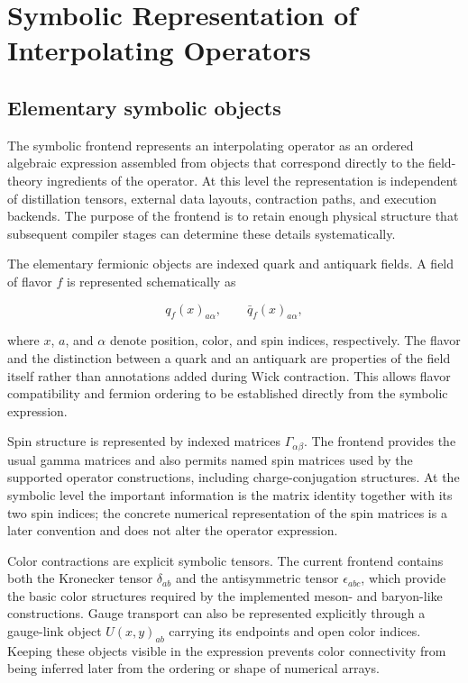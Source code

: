 \documentclass[11pt]{article}
\begin{document}
\section{Symbolic Representation of Interpolating Operators}
\label{sec:symbolic}

\subsection{Elementary symbolic objects}

The symbolic frontend represents an interpolating operator as an ordered
algebraic expression assembled from objects that correspond directly to the
field-theory ingredients of the operator. At this level the representation is
independent of distillation tensors, external data layouts, contraction paths,
and execution backends. The purpose of the frontend is to retain enough
physical structure that subsequent compiler stages can determine these details
systematically.

The elementary fermionic objects are indexed quark and antiquark fields. A
field of flavor \(f\) is represented schematically as

\begin{equation}
q_f(x)_{a\alpha},
\qquad
\bar q_f(x)_{a\alpha},
\label{eq:symbolic_quark_field}
\end{equation}

where \(x\), \(a\), and \(\alpha\) denote position, color, and spin indices,
respectively. The flavor and the distinction between a quark and an antiquark
are properties of the field itself rather than annotations added during Wick
contraction. This allows flavor compatibility and fermion ordering to be
established directly from the symbolic expression.

Spin structure is represented by indexed matrices
\(\Gamma_{\alpha\beta}\). The frontend provides the usual gamma matrices and
also permits named spin matrices used by the supported operator constructions,
including charge-conjugation structures. At the symbolic level the important
information is the matrix identity together with its two spin indices; the
concrete numerical representation of the spin matrices is a later convention
and does not alter the operator expression.

Color contractions are explicit symbolic tensors. The current frontend contains
both the Kronecker tensor \(\delta_{ab}\) and the antisymmetric tensor
\(\epsilon_{abc}\), which provide the basic color structures required by the
implemented meson- and baryon-like constructions. Gauge transport can also be
represented explicitly through a gauge-link object
\(U(x,y)_{ab}\) carrying its endpoints and open color indices. Keeping these
objects visible in the expression prevents color connectivity from being
inferred later from the ordering or shape of numerical arrays.
\end{document}
